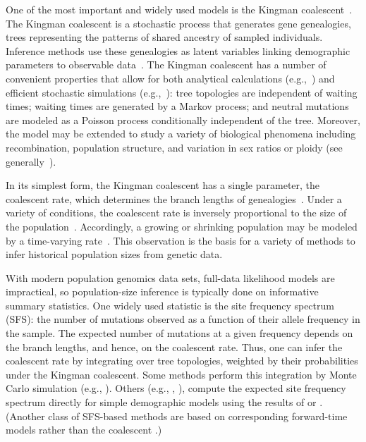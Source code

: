 \documentclass[11pt, letterpaper]{article}   	%
\begin{document}
One of the most important and widely used models is the Kingman coalescent~\autocite{Kingman1982a, Kingman1982b, Kingman1982c, Hudson1983, Tajima1983}.
The Kingman coalescent is a stochastic process that generates gene genealogies, trees representing the patterns of shared ancestry of sampled individuals.
Inference methods use these genealogies as latent variables linking demographic parameters to observable data~\autocite{RosenbergNordborg2002}.
The Kingman coalescent has a number of convenient properties that allow for both analytical calculations (e.g.,~\cite{Tajima1989}) and efficient stochastic simulations (e.g.,~\cite{Hudson2002}): tree topologies are independent of waiting times; waiting times are generated by a Markov process; and neutral mutations are modeled as a Poisson process conditionally independent of the tree.
Moreover, the model may be extended to study a variety of biological phenomena including recombination, population structure, and variation in sex ratios or ploidy (see generally~\cite{Wakeley2009}).

In its simplest form, the Kingman coalescent has a single parameter, the coalescent rate, which determines the branch lengths of genealogies~\autocite{Kingman1982a}.
Under a variety of conditions, the coalescent rate is inversely proportional to the size of the population~\autocite{Kingman1982b}.
Accordingly, a growing or shrinking population may be modeled by a time-varying rate~\autocite{GriffithsTavare1994, GriffithsTavare1998}.
This observation is the basis for a variety of methods to infer historical population sizes from genetic data.

With modern population genomics data sets, full-data likelihood models are impractical, so population-size inference is typically done on informative summary statistics.
One widely used statistic is the site frequency spectrum (SFS): the number of mutations observed as a function of their allele frequency in the sample.
The expected number of mutations at a given frequency depends on the branch lengths, and hence, on the coalescent rate.
Thus, one can infer the coalescent rate by integrating over tree topologies, weighted by their probabilities under the Kingman coalescent.
Some methods perform this integration by Monte Carlo simulation (e.g., \cite{CoventryEtAl2010, ExcoffierEtAl2013}).
Others (e.g., \cite{Nielsen2000}, \cite{BhaskarEtAl2015}), compute the expected site frequency spectrum directly for simple demographic models using the results of \cite{GriffithsTavare1998} or \cite{PolanskiKimmel2003}.
(Another class of SFS-based methods are based on corresponding forward-time models rather than the coalescent \autocite{GutenkunstEtAl2009, LukicEtAl2011, RagsdaleGutenkunst2017, JouganousEtAl2017}.)
\end{document}
